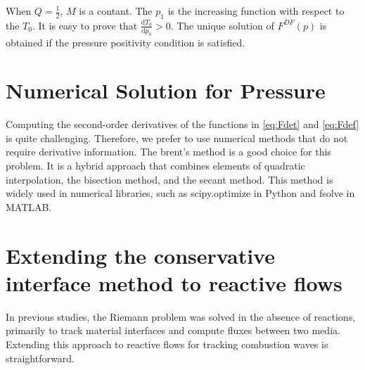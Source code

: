 When $Q=\frac{1}{2}$, $M$ is a contant. The $p_1$ is the increasing function with respect to the $T_0$.
It is easy to prove that $\frac{\mathrm{d} T_0}{\mathrm{d} p_0} >0$. The unique solution of $F^{DF}(p)$ is obtained if the pressure positivity condition is satisfied.

\section{Numerical Solution for Pressure}
Computing the second-order derivatives of the functions in \eqref{eq:Fdet} and \eqref{eq:Fdef} is quite challenging. Therefore, we prefer to use numerical methods that do not require derivative information. The brent's method \cite{brentAlgorithmsMinimizationDerivatives1973} is a good choice for this problem. It is a hybrid approach that combines elements of quadratic interpolation, the bisection method, and the secant method. This method is widely used in numerical libraries, such as scipy.optimize in Python and fsolve in MATLAB.
\section{Extending the conservative interface method to reactive flows}
In previous studies, the Riemann problem was solved in the absence of reactions, primarily to track material interfaces and compute fluxes between two media. Extending this approach to reactive flows for tracking combustion waves is straightforward.

